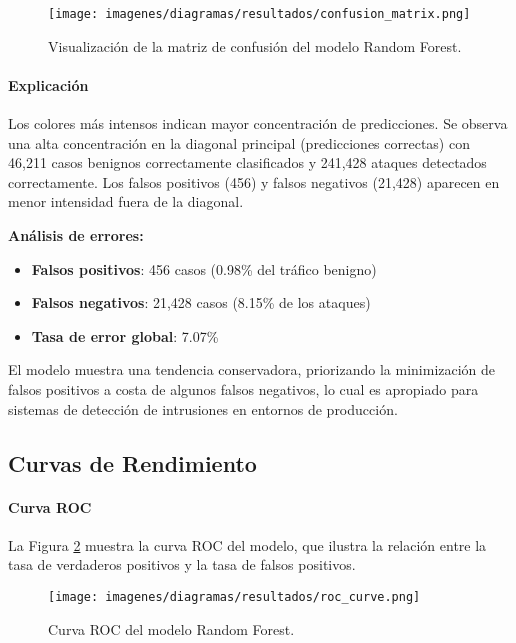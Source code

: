 \begin{figure}[H]
\centering
\texttt{[image: imagenes/diagramas/resultados/confusion\_matrix.png]}
\caption{Visualización de la matriz de confusión del modelo Random Forest.}
\label{fig:confusion_matrix}
\end{figure}
\paragraph{Explicación}
Los colores más intensos indican mayor concentración de predicciones. Se observa una alta concentración en la diagonal principal (predicciones correctas) con 46,211 casos benignos correctamente clasificados y 241,428 ataques detectados correctamente. Los falsos positivos (456) y falsos negativos (21,428) aparecen en menor intensidad fuera de la diagonal.

\textbf{Análisis de errores:}
\begin{itemize}
\item \textbf{Falsos positivos}: 456 casos (0.98\% del tráfico benigno)
\item \textbf{Falsos negativos}: 21,428 casos (8.15\% de los ataques)
\item \textbf{Tasa de error global}: 7.07\%
\end{itemize}

El modelo muestra una tendencia conservadora, priorizando la minimización de falsos positivos a costa de algunos falsos negativos, lo cual es apropiado para sistemas de detección de intrusiones en entornos de producción.

\subsection{Curvas de Rendimiento}

\paragraph{Curva ROC}

La Figura \ref{fig:roc_curve} muestra la curva ROC del modelo, que ilustra la relación entre la tasa de verdaderos positivos y la tasa de falsos positivos.

\begin{figure}[H]
\centering
\texttt{[image: imagenes/diagramas/resultados/roc\_curve.png]}
\caption{Curva ROC del modelo Random Forest.}
\label{fig:roc_curve}
\end{figure}

